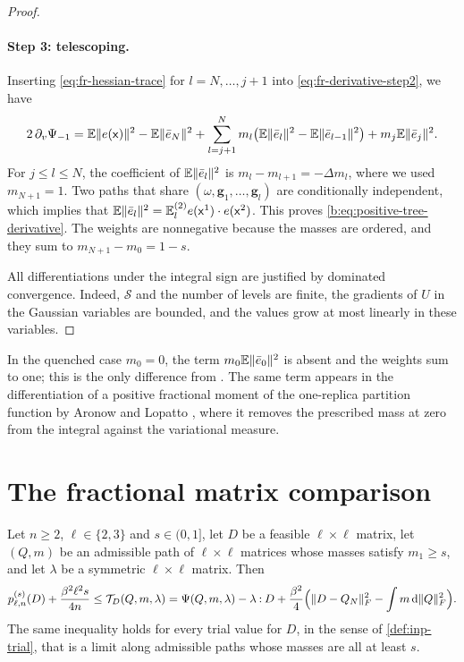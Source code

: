 \begin{proof}
\paragraph{Step 3: telescoping.} Inserting \eqref{eq:fr-hessian-trace} for $l=N,\dots,j+1$ into \eqref{eq:fr-derivative-step2}, we have
\[
 2\,\partial_v\Psi_{-1}
 =\mathbb E\lVert e(\mathsf x)\rVert^2-\mathbb E\lVert \bar e_N\rVert^2+\sum_{l=j+1}^Nm_l\bigl(\mathbb E\lVert \bar e_l\rVert^2-\mathbb E\lVert \bar e_{l-1}\rVert^2\bigr)+m_j\mathbb E\lVert \bar e_j\rVert^2.
\]
For $j\le l\le N$, the coefficient of $\mathbb E\lVert \bar e_l\rVert^2$ is $m_l-m_{l+1}=-\Delta m_l$, where we used $m_{N+1}=1$. Two paths that share $(\omega,\mathbf g_1,\dots,\mathbf g_l)$ are conditionally independent, which implies that $\mathbb E\lVert \bar e_l\rVert^2=\mathbb E^{(2)}_le(\mathsf x^1)\cdot e(\mathsf x^2)$. This proves \eqref{b:eq:positive-tree-derivative}. The weights are nonnegative because the masses are ordered, and they sum to $m_{N+1}-m_0=1-s$.

All differentiations under the integral sign are justified by dominated convergence. Indeed, $\mathcal S$ and the number of levels are finite, the gradients of $U$ in the Gaussian variables are bounded, and the values grow at most linearly in these variables.
\end{proof}

In the quenched case $m_0=0$, the term $m_0\mathbb E\lVert \bar e_0\rVert^2$ is absent and the weights sum to one; this is the only difference from \cite[Lemma~2.2]{oai-barriers}. The same term appears in the differentiation of a positive fractional moment of the one-replica partition function by Aronow and Lopatto \cite[Section~2.3, (2.10)--(2.11)]{quantitative-parisi}, where it removes the prescribed mass at zero from the integral against the variational measure.

\section{The fractional matrix comparison}\label{sec:fr-comparison}

\begin{proposition}\label{b:prop:fractional-matrix}
Let $n\ge2$, $\ell\in\{2,3\}$ and $s\in(0,1]$, let $D$ be a feasible $\ell\times\ell$ matrix, let $(Q,m)$ be an admissible path of $\ell\times\ell$ matrices whose masses satisfy $m_1\ge s$, and let $\lambda$ be a symmetric $\ell\times\ell$ matrix. Then
\begin{equation}\label{b:eq:fractional-matrix-exact}
 p^{(s)}_{\ell,n}(D)+\frac{\beta^2\ell^2s}{4n}
 \le\mathcal T_D(Q,m,\lambda)
 =\Psi(Q,m,\lambda)-\lambda\mathbin{:}D+\frac{\beta^2}4\Bigl(\lVert D-Q_N\rVert_F^2-\int m\,\mathrm d\lVert Q\rVert_F^2\Bigr).
\end{equation}
The same inequality holds for every trial value for $D$, in the sense of \cref{def:inp-trial}, that is a limit along admissible paths whose masses are all at least $s$.
\end{proposition}

